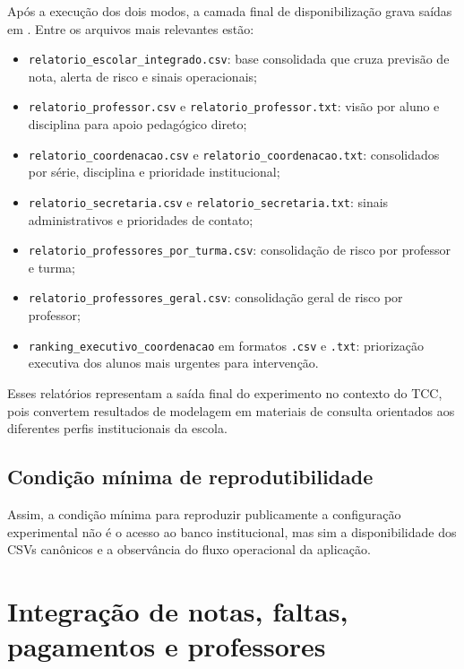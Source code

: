 Ap\'os a execu\c{c}\~ao dos dois modos, a camada final de disponibiliza\c{c}\~ao grava sa\'idas em . Entre os arquivos mais relevantes est\~ao:
\begin{itemize}
    \item \texttt{relatorio\_escolar\_integrado.csv}: base consolidada que cruza previs\~ao de nota, alerta de risco e sinais operacionais;
    \item \texttt{relatorio\_professor.csv} e \texttt{relatorio\_professor.txt}: vis\~ao por aluno e disciplina para apoio pedag\'ogico direto;
    \item \texttt{relatorio\_coordenacao.csv} e \texttt{relatorio\_coordenacao.txt}: consolidados por s\'erie, disciplina e prioridade institucional;
    \item \texttt{relatorio\_secretaria.csv} e \texttt{relatorio\_secretaria.txt}: sinais administrativos e prioridades de contato;
    \item \texttt{relatorio\_professores\_por\_turma.csv}: consolida\c{c}\~ao de risco por professor e turma;
    \item \texttt{relatorio\_professores\_geral.csv}: consolida\c{c}\~ao geral de risco por professor;
    \item \texttt{ranking\_executivo\_coordenacao} em formatos \texttt{.csv} e \texttt{.txt}: prioriza\c{c}\~ao executiva dos alunos mais urgentes para interven\c{c}\~ao.
\end{itemize}

Esses relat\'orios representam a sa\'ida final do experimento no contexto do TCC, pois convertem resultados de modelagem em materiais de consulta orientados aos diferentes perfis institucionais da escola.

\subsection{Condi\c{c}\~ao m\'inima de reprodutibilidade}

Assim, a condi\c{c}\~ao m\'inima para reproduzir publicamente a configura\c{c}\~ao experimental n\~ao \'e o acesso ao banco institucional, mas sim a disponibilidade dos CSVs can\^onicos e a observ\^ancia do fluxo operacional da aplica\c{c}\~ao.

\section{Integra\c{c}\~ao de notas, faltas, pagamentos e professores}
\label{sec:fontes-dados-integradas}
\label{sec:integracao}

